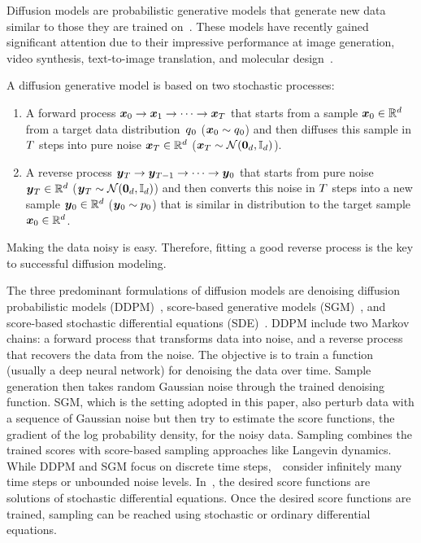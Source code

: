 
Diffusion models are probabilistic generative models that generate new data similar to those they are trained on~\citep{song2019generative,ho2020denoising,song2020score}.
These models have recently gained significant attention due to their impressive performance    at image generation, video synthesis, text-to-image translation, and molecular design~\citep{dhariwal2021diffusion,ho2022video,ramesh2022hierarchical,xu2022geodiff}.


A diffusion generative model is based on two stochastic processes: 
\begin{enumerate}
    \item A forward process 
$ \Fx_0\to \Fx_1\to \dots \to \Fx_{\T}$ that starts from a sample $\Fx_0 \in \R^{\Dim}$  from a target data distribution~$\q_0$ ($\Fx_0\sim \q_0$) and then diffuses this sample in $\T$ steps into  pure noise $\Fx_{\T}\in  \R^{\Dim}$ ($\Fx_{\T}\sim\StandNormal$).
\item 
A reverse process $\BY_{\T}\to \BY_{\T-1}\to \dots \to \BY_0$ that starts from  pure noise  $\BY_{\T} \in\R^{\Dim}$ ($\BY_{\T}\sim\StandNormal$) and then converts this noise in $\T$ steps into a new sample $\BY_0\in \R^{\Dim}$ ($\BY_0\sim p_0$) that is similar in  distribution to the target sample $\x_0\in \R^{\Dim}$.
\end{enumerate}
\noindent 
Making the data noisy is easy.
Therefore, fitting a good reverse process is the key to successful diffusion modeling.

The three predominant formulations of diffusion models are denoising diffusion probabilistic models
(DDPM)~\citep{ho2020denoising}, score-based generative models (SGM)~\citep{song2019generative}, and score-based stochastic differential equations (SDE)~\citep{song2020score,song2021maximum}.
DDPM include two Markov chains: 
a forward process that transforms data into noise, and a reverse process that recovers the data from the noise. 
The objective is to train a function  (usually a deep neural network) for denoising the data over time.
Sample generation then  takes random Gaussian noise through the trained denoising function. 
SGM, which is the setting adopted in  this paper,  also  perturb data with a sequence of  Gaussian noise but then try to estimate the score functions, the gradient of the log probability density, for the noisy data. 
Sampling combines the trained scores with score-based sampling approaches like Langevin dynamics. 
While DDPM and SGM focus on discrete time steps,~\sde~consider infinitely many time steps or unbounded noise levels. In~\sde, the desired score functions are solutions of stochastic differential equations. 
Once the desired score functions are trained,  sampling can be reached using stochastic or ordinary differential equations.


